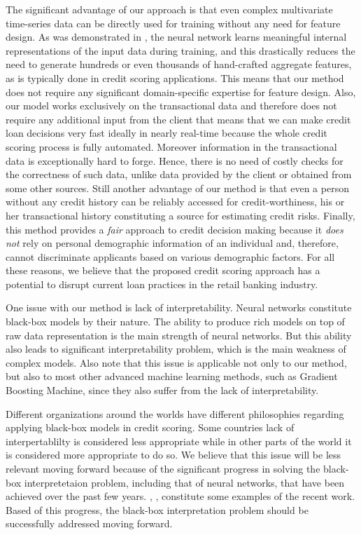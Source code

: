 \documentclass[sigconf]{acmart}
\begin{document}
The significant advantage of our approach is that even complex multivariate time-series data can be directly used for training without any need for feature design. As was demonstrated in \cite{Erhan2009VisualizingHF}, the neural network learns meaningful internal representations of the input data during training, and this drastically reduces the need to generate hundreds or even thousands of hand-crafted aggregate features, as is typically done in credit scoring applications. This means that our method does not require any significant domain-specific expertise for feature design.
Also, our model works exclusively on the transactional data and therefore does not require any additional input from the client that means that we can make credit loan decisions very fast ideally in nearly real-time because the whole credit scoring process is fully automated.
Moreover information in the transactional data is exceptionally hard to forge. Hence, there is no need of costly checks for the correctness of such data, unlike data provided by the client or obtained from some other sources.
Still another advantage of our method is that even a person without any credit history can be reliably accessed for credit-worthiness, his or her transactional history constituting a source for estimating credit risks.
Finally, this method provides a \textit{fair} approach to credit decision making because it \textit{does not} rely on personal demographic information of an individual and, therefore, cannot discriminate applicants based on various demographic factors.
For all these reasons, we believe that the proposed credit scoring approach has a potential to disrupt current loan practices in the retail banking industry.

One issue with our method is lack of interpretability. Neural networks constitute black-box models by their nature. The ability to produce rich models on top of raw data representation is the main strength of neural networks. But this ability also leads to significant interpretability problem, which is the main weakness of complex models. Also note that this issue is applicable not only to our method, but also to most other advanced machine learning methods, such as  Gradient Boosting Machine, since they also suffer from the lack of interpretability.

Different organizations around the worlds have different philosophies regarding applying black-box models in credit scoring. Some countries lack of interpertablilty is considered less appropriate while in other parts of the world it is considered more appropriate to do so. We believe that this issue will be less relevant moving forward because of the significant progress in solving the black-box interpretetaion problem, including that of neural networks, that have been achieved over the past few years. \cite{DBLP:journals/corr/ChoiBSSS16}, \cite{gupta2018lisa}, \cite{mccoy2018rnns} constitute some examples of the recent work. Based of this progress, the black-box interpretation problem should be successfully addressed moving forward.
\end{document}
